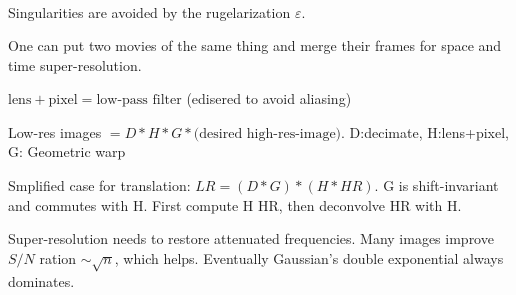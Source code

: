 \begin{compactdesc}
\begin{gather*}
		\end{gather*}
		Singularities are avoided by the rugelarization $\varepsilon$.
	\item[\lp{Space-time super-resolution}] One can put two movies of the same thing and merge their frames for space and time super-resolution.
	\item[\lp{Spatial super-resolution}] 
		\begin{inparaitem}
			\item $\text{lens}+\text{pixel}=\text{low-pass filter}$ (edisered to avoid aliasing)
			\item Low-res images $=D*H*G*\text{(desired high-res-image)}$. D:decimate, H:lens+pixel, G: Geometric warp
			\item Smplified case for translation: $LR=(D*G)*(H*HR)$. G is shift-invariant and commutes with H. First compute H HR, then deconvolve HR with H.
			\item Super-resolution needs to restore attenuated frequencies. Many images improve $S/N$ ration $\sim\sqrt{n}$, which helps. Eventually Gaussian's double exponential always dominates.
		\end{inparaitem}
\end{compactdesc}
